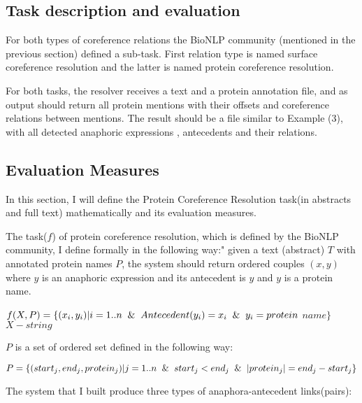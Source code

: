 \subsection{Task description and evaluation}

For both types of coreference relations the BioNLP community (mentioned in the previous section) defined a sub-task. First relation type is named surface coreference resolution and the latter is named protein coreference resolution.

For both tasks, the resolver receives a text and a protein annotation file, and as output should return all protein mentions with their offsets and coreference relations between mentions. The result should be a file similar to Example (3), with all detected anaphoric expressions , antecedents and their relations. 

\subsection{Evaluation Measures}

In this section, I will define the Protein Coreference Resolution task(in abstracts and full text) mathematically and its evaluation measures.

The task($f$) of protein coreference resolution, which is defined by the BioNLP community, I define formally in the following way:" given a text (abstract) $T$ with annotated protein names $P$, the system should return ordered couples $(x, y)$ where $y$
is an anaphoric expression and its antecedent is $y$ and  $y$ is a protein name.\\
\begin{center}
  $f(X,P)=\{(x_i,y_i) |i=1..n \And Antecedent(y_i)=x_i \And y_i= protein$  $name\}$ \\
  $X-string$ \\
\end{center}

$P$ is a set of ordered set defined in the following way:\\
\begin{center}
    $P= \{(start_j, end_j, protein_j)| j=1..n \And start_j< end_j \And |protein_j|= end_j-start_j\}$\\
\end{center}
 
The system that I built produce three types of anaphora-antecedent links(pairs):

